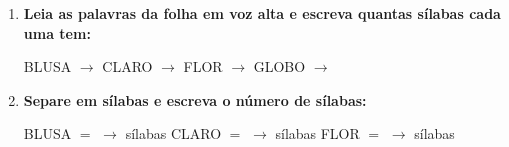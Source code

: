 \begin{exercicio}
\begin{enumerate}[resume]
  \item \textbf{Leia as palavras da folha em voz alta e escreva quantas sílabas cada uma tem:}

  \begin{center}
  BLUSA $\rightarrow$ \underline{\hspace{1cm}} \quad CLARO $\rightarrow$ \underline{\hspace{1cm}} \quad FLOR $\rightarrow$ \underline{\hspace{1cm}} \quad GLOBO $\rightarrow$ \underline{\hspace{1cm}}
  \end{center}

  \item \textbf{Separe em sílabas e escreva o número de sílabas:}
  \begin{center}
  BLUSA $=$ \underline{\hspace{1.2cm}} $\rightarrow$ \underline{\hspace{0.8cm}} sílabas \quad CLARO $=$ \underline{\hspace{1.2cm}} $\rightarrow$ \underline{\hspace{0.8cm}} sílabas \quad FLOR $=$ \underline{\hspace{1.2cm}} $\rightarrow$ \underline{\hspace{0.8cm}} sílabas
  \end{center}

\end{enumerate}

\end{exercicio}



